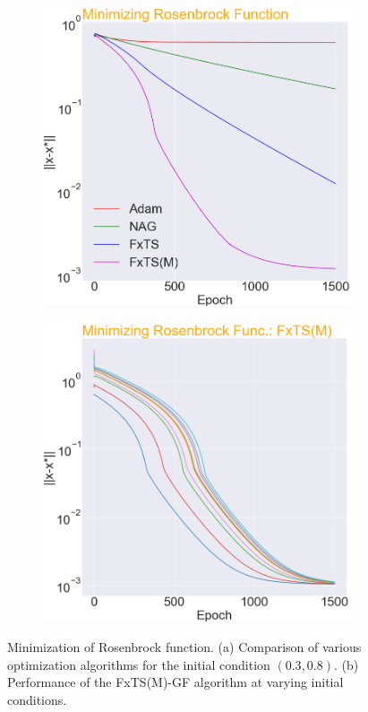 \documentclass[letterpaper]{article}
\begin{document}
\begin{figure}
     \centering
     \begin{subfigure}
         \centering
         \includegraphics[width=0.47\linewidth]{Figures/RF.png}
         \label{fig:sub-first}
     \end{subfigure}
     \hfill
     \begin{subfigure}
         \centering
         \includegraphics[width=0.47\linewidth]{Figures/RF_FxTS_M.png}
         \label{fig:sub-second}
     \end{subfigure}
        \caption{Minimization of Rosenbrock function. (a) Comparison of various optimization algorithms for the initial condition $(0.3,0.8)$. (b) Performance of the FxTS(M)-GF algorithm at varying initial conditions.}
        \label{fig:Rosenbrock}
\end{figure}
\end{document}

